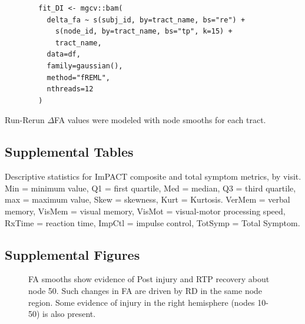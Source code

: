 \documentclass[12pt]{article}
\begin{document}
\begin{equ}[H]
	\begin{lstlisting}
		fit_DI <- mgcv::bam(
		  delta_fa ~ s(subj_id, by=tract_name, bs="re") +
		    s(node_id, by=tract_name, bs="tp", k=15) +
		    tract_name,
		  data=df,
		  family=gaussian(),
		  method="fREML",
		  nthreads=12
		)
	\end{lstlisting}
	\caption{Run-Rerun $\Delta$FA values were modeled with node smooths for each tract.}
	\label{supp-code:gam-di}
\end{equ}


\subsection{Supplemental Tables}
\label{ssec:supp-tables}
\begin{table}[H]
	\scriptsize
	
	\caption{Descriptive statistics for ImPACT composite and total symptom metrics, by visit. Min = minimum value, Q1 = first quartile, Med = median, Q3 = third quartile, max = maximum value, Skew = skewness, Kurt = Kurtosis. VerMem = verbal memory, VisMem = visual memory, VisMot = visual-motor processing speed, RxTime = reaction time, ImpCtl = impulse control, TotSymp = Total Symptom.}
	\label{supp-tbl:imp-desc}
\end{table}


\subsection{Supplemental Figures}
\label{ssec:supp-figures}

\begin{figure}[H]
	\centering
	\caption{FA smooths show evidence of Post injury and RTP recovery about node 50. Such changes in FA are driven by RD in the same node region. Some evidence of injury in the right hemisphere (nodes 10-50) is also present.}
	\label{supp-fig:lgio-gam-recov}
\end{figure}
\end{document}
